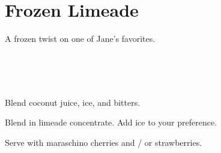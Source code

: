 \section[Frozen Limeade]{Frozen Limeade~\vegan}


\begin{recipestats}[
	servings=8 people,
	preptime=10 \minute,
	source=Mike \& Jane,
]
\end{recipestats}


\begin{recipeabstract}
	A frozen twist on one of Jane's favorites.
\end{recipeabstract}


\begin{ingredientcolumns}[1]
	\begin{ingredientblock}
		\\
		\\
		\\
	\end{ingredientblock}
\end{ingredientcolumns}


\begin{preparation}
\item Blend coconut juice, ice, and bitters.

\item Blend in limeade concentrate.
	Add ice to your preference.
\end{preparation}


\begin{variation}
\item Serve with maraschino cherries and / or strawberries.
\end{variation}


\recipeend

